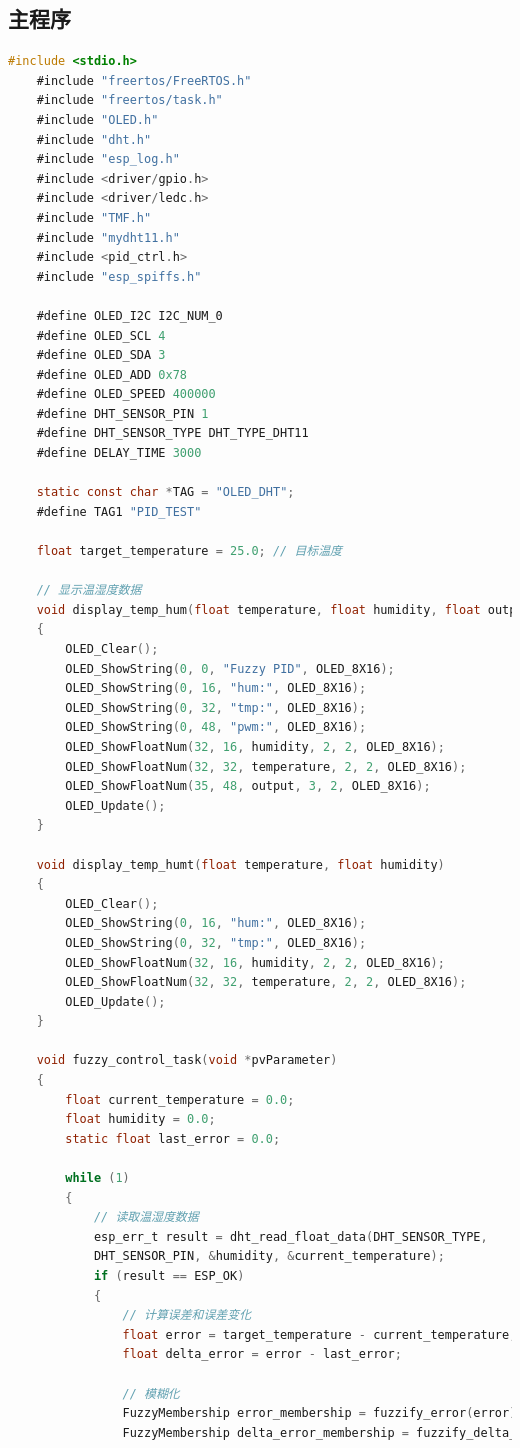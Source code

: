 \documentclass[UTF8]{ctexart}
\begin{document}
\newpage
\begin{appendices}
\section{主程序}
\begin{lstlisting}[language=C, caption={main.c}]
	#include <stdio.h>
	#include "freertos/FreeRTOS.h"
	#include "freertos/task.h"
	#include "OLED.h"
	#include "dht.h"
	#include "esp_log.h"
	#include <driver/gpio.h>
	#include <driver/ledc.h>
	#include "TMF.h"
	#include "mydht11.h"
	#include <pid_ctrl.h>
	#include "esp_spiffs.h"
	
	#define OLED_I2C I2C_NUM_0
	#define OLED_SCL 4
	#define OLED_SDA 3
	#define OLED_ADD 0x78
	#define OLED_SPEED 400000
	#define DHT_SENSOR_PIN 1
	#define DHT_SENSOR_TYPE DHT_TYPE_DHT11
	#define DELAY_TIME 3000
	
	static const char *TAG = "OLED_DHT";
	#define TAG1 "PID_TEST"
	
	float target_temperature = 25.0; // 目标温度
	
	// 显示温湿度数据
	void display_temp_hum(float temperature, float humidity, float output)
	{
		OLED_Clear();
		OLED_ShowString(0, 0, "Fuzzy PID", OLED_8X16);
		OLED_ShowString(0, 16, "hum:", OLED_8X16);
		OLED_ShowString(0, 32, "tmp:", OLED_8X16);
		OLED_ShowString(0, 48, "pwm:", OLED_8X16);
		OLED_ShowFloatNum(32, 16, humidity, 2, 2, OLED_8X16);
		OLED_ShowFloatNum(32, 32, temperature, 2, 2, OLED_8X16);
		OLED_ShowFloatNum(35, 48, output, 3, 2, OLED_8X16);
		OLED_Update();
	}
	
	void display_temp_humt(float temperature, float humidity)
	{
		OLED_Clear();
		OLED_ShowString(0, 16, "hum:", OLED_8X16);
		OLED_ShowString(0, 32, "tmp:", OLED_8X16);
		OLED_ShowFloatNum(32, 16, humidity, 2, 2, OLED_8X16);
		OLED_ShowFloatNum(32, 32, temperature, 2, 2, OLED_8X16);
		OLED_Update();
	}
	
	void fuzzy_control_task(void *pvParameter)
	{
		float current_temperature = 0.0;
		float humidity = 0.0;
		static float last_error = 0.0;
		
		while (1)
		{
			// 读取温湿度数据
			esp_err_t result = dht_read_float_data(DHT_SENSOR_TYPE,
			DHT_SENSOR_PIN, &humidity, &current_temperature);
			if (result == ESP_OK)
			{
				// 计算误差和误差变化
				float error = target_temperature - current_temperature;
				float delta_error = error - last_error;
				
				// 模糊化
				FuzzyMembership error_membership = fuzzify_error(error);
				FuzzyMembership delta_error_membership = fuzzify_delta_error(delta_error);
				

\end{lstlisting}
\end{appendices}
\end{document}
